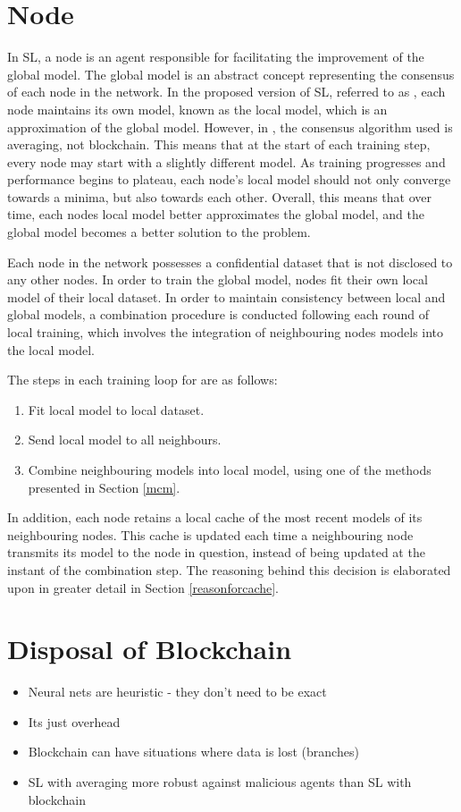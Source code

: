 \section{Node}
In SL, a node is an agent responsible for facilitating the improvement of the global model. The global model is an abstract concept representing the consensus of each node in the network. In the proposed version of SL, referred to as \SL, each node maintains its own model, known as the local model, which is an approximation of the global model. However, in \SL, the consensus algorithm used is averaging, not blockchain. This means that at the start of each training step, every node may start with a slightly different model. As training progresses and performance begins to plateau, each node's local model should not only converge towards a minima, but also towards each other. Overall, this means that over time, each nodes local model better approximates the global model, and the global model becomes a better solution to the problem.

Each node in the network possesses a confidential dataset that is not disclosed to any other nodes. In order to train the global model, nodes fit their own local model of their local dataset. In order to maintain consistency between local and global models, a combination procedure is conducted following each round of local training, which involves the integration of neighbouring nodes models into the local model.

The steps in each training loop for \SL are as follows:
\begin{enumerate}
	\item Fit local model to local dataset.
	\item Send local model to all neighbours.
	\item Combine neighbouring models into local model, using one of the methods presented in Section \ref{mcm}.
\end{enumerate}

In addition, each node retains a local cache of the most recent models of its neighbouring nodes. This cache is updated each time a neighbouring node transmits its model to the node in question, instead of being updated at the instant of the combination step. The reasoning behind this decision is elaborated upon in greater detail in Section \ref{reasonforcache}.

\section{Disposal of Blockchain}
\begin{itemize}
	\item Neural nets are heuristic - they don't need to be exact
	\item Its just overhead
	\item Blockchain can have situations where data is lost (branches) \checkme
	\item SL with averaging more robust against malicious agents than SL with blockchain  \checkme
\end{itemize}

